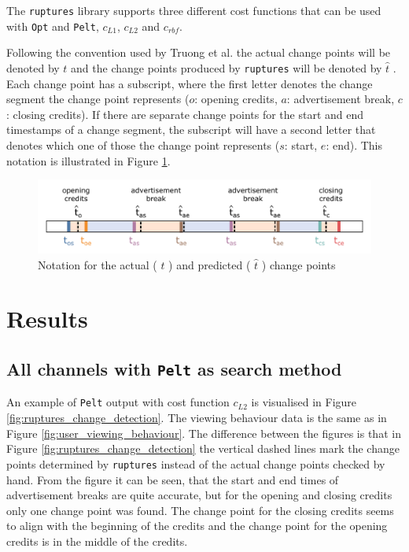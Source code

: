 The \texttt{ruptures} library supports three different cost functions that can be used with \texttt{Opt} and \texttt{Pelt}, $c_{L1}$, $c_{L2}$ and $c_{rbf}$.

Following the convention used by Truong et al. the actual change points will be denoted by $t$ and the change points produced by \texttt{ruptures} will be denoted by $\hat{t}$ \cite{truongSelectiveReviewOffline2020}. Each change point has a subscript, where the first letter denotes the change segment the change point represents ($o$: opening credits, $a$: advertisement break, $c$: closing credits). If there are separate change points for the start and end timestamps of a change segment, the subscript will have a second letter that denotes which one of those the change point represents ($s$: start, $e$: end). This notation is illustrated in Figure \ref{fig:change_point_notation}.

\begin{figure}[H]
    \centering
    \includegraphics[width=1\textwidth]{../plots/timeline.pdf}
    \caption{Notation for the actual ( $t$ ) and predicted ( $\hat{t}$ ) change points}
    \label{fig:change_point_notation}
\end{figure}

\section{Results} \label{sec:results}

\subsection{All channels with \texttt{Pelt} as search method} \label{sec:results_pelt}

An example of \texttt{Pelt} output with cost function $c_{L2}$ is visualised in Figure \ref{fig:ruptures_change_detection}. The viewing behaviour data is the same as in Figure \ref{fig:user_viewing_behaviour}. The difference between the figures is that in Figure \ref{fig:ruptures_change_detection} the vertical dashed lines mark the change points determined by \texttt{ruptures} instead of the actual change points checked by hand. From the figure it can be seen, that the start and end times of advertisement breaks are quite accurate, but for the opening and closing credits only one change point was found. The change point for the closing credits seems to align with the beginning of the credits and the change point for the opening credits is in the middle of the credits.

